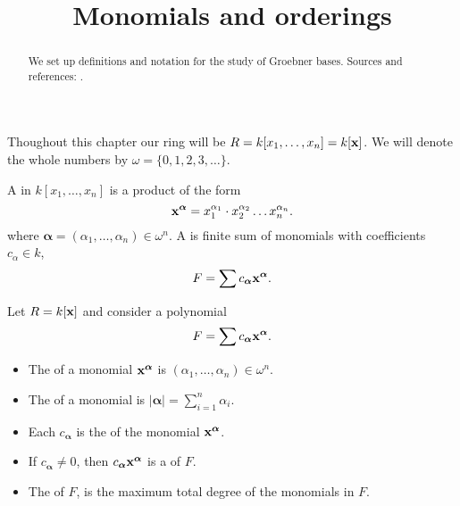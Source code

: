 \documentclass{ximera}
\title{Monomials and orderings}
\begin{document}
\begin{abstract}
  We set up definitions and notation for the study of Groebner
  bases. Sources and references: \cite{CLO2007}.
\end{abstract}
\maketitle

Thoughout this chapter our ring will be $R=k[x_1,\dots,x_n] =
k[\mathbf{x}]$. We will denote the whole numbers by $\omega =
\{0,1,2,3,\dots\}$.


\begin{definition}
  A  in $k[x_1,\dots,x_n]$ is a product of the form
  \[
  \mathbf{x}^{\boldsymbol{\alpha}} = x_1^{\alpha_1}\cdot x_2^{\alpha_2}  \dots x_n^{\alpha_n}.
  \]
  where $\boldsymbol{\alpha} = (\alpha_1,\dots,\alpha_n) \in
  \omega^n$.  A  is finite sum of monomials with
  coefficients $c_\alpha\in k$,
  \[
  F = \sum c_{\boldsymbol{\alpha}} \mathbf{x}^{\boldsymbol{\alpha}}.
  \]
\end{definition}


\begin{definition}
  Let $R = k[\mathbf{x}]$ and consider a polynomial
  \[
  F =  \sum c_{\boldsymbol{\alpha}} \mathbf{x}^{\boldsymbol{\alpha}}.
  \]
  \begin{itemize}
    \item The  of a monomial $\mathbf{x}^{\boldsymbol\alpha}$ is
      $(\alpha_1,\dots,\alpha_n)\in \omega^n$.
    \item The  of a monomial is
      $|\boldsymbol{\alpha}| = \sum_{i=1}^n \alpha_i$.
    \item Each $c_{\boldsymbol\alpha}$ is the  of the
      monomial $\mathbf{x}^{\boldsymbol\alpha}$.
    \item If $c_{\boldsymbol\alpha} \ne 0$, then
      $c_{\boldsymbol\alpha}\mathbf{x}^{\boldsymbol\alpha}$ is a  of
      $F$.
    \item The  of $F$, is the maximum total degree
      of the monomials in $F$.
  \end{itemize}
\end{definition}
\end{document}
